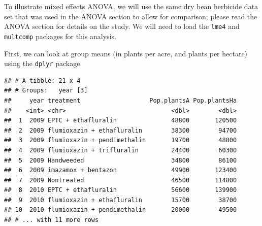 \documentclass[letterpaper,]{book}
\newenvironment{Shaded}{\begin{snugshade}}{\end{snugshade}}
\newcommand{\DataTypeTok}[1]{\textcolor[rgb]{0.13,0.29,0.53}{#1}}
\newcommand{\DecValTok}[1]{\textcolor[rgb]{0.00,0.00,0.81}{#1}}
\newcommand{\FloatTok}[1]{\textcolor[rgb]{0.00,0.00,0.81}{#1}}
\newcommand{\KeywordTok}[1]{\textcolor[rgb]{0.13,0.29,0.53}{\textbf{#1}}}
\newcommand{\NormalTok}[1]{#1}
\newcommand{\OperatorTok}[1]{\textcolor[rgb]{0.81,0.36,0.00}{\textbf{#1}}}
\newcommand{\StringTok}[1]{\textcolor[rgb]{0.31,0.60,0.02}{#1}}
\begin{document}
To illustrate mixed effects ANOVA, we will use the same dry bean herbicide data set that was used in the ANOVA section to allow for comparison; please read the ANOVA section for details on the study. We will need to load the \texttt{lme4} and \texttt{multcomp} packages for this analysis.

\begin{Shaded}
\end{Shaded}

First, we can look at group means (in plants per acre, and plants per hectare) using the \texttt{dplyr} package.

\begin{Shaded}
\end{Shaded}

\begin{verbatim}
## # A tibble: 21 x 4
## # Groups:   year [3]
##     year treatment                   Pop.plantsA Pop.plantsHa
##    <int> <chr>                             <dbl>        <dbl>
##  1  2009 EPTC + ethafluralin               48800       120500
##  2  2009 flumioxazin + ethafluralin        38300        94700
##  3  2009 flumioxazin + pendimethalin       19700        48800
##  4  2009 flumioxazin + trifluralin         24400        60300
##  5  2009 Handweeded                        34800        86100
##  6  2009 imazamox + bentazon               49900       123400
##  7  2009 Nontreated                        46500       114800
##  8  2010 EPTC + ethafluralin               56600       139900
##  9  2010 flumioxazin + ethafluralin        15700        38700
## 10  2010 flumioxazin + pendimethalin       20000        49500
## # ... with 11 more rows
\end{verbatim}
\end{document}
